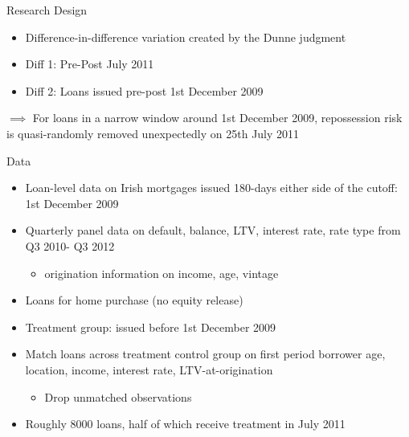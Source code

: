 \documentclass[ignorenonframetext,aspectratio=169]{beamer}
\providecommand{\tightlist}{%
  \setlength{\itemsep}{0pt}\setlength{\parskip}{0pt}}
\begin{document}
\begin{frame}{Research Design}

\begin{itemize}
\item
  Difference-in-difference variation created by the Dunne judgment
\item
  Diff 1: Pre-Post July 2011
\item
  Diff 2: Loans issued pre-post 1st December 2009
\end{itemize}

\(\implies\) For loans in a narrow window around 1st December 2009,
repossession risk is quasi-randomly removed unexpectedly on 25th July
2011

\end{frame}

\begin{frame}{Data}

\begin{itemize}
\item
  Loan-level data on Irish mortgages issued 180-days either side of the
  cutoff: 1st December 2009
\item
  Quarterly panel data on default, balance, LTV, interest rate, rate
  type from Q3 2010- Q3 2012

  \begin{itemize}
  \tightlist
  \item
    origination information on income, age, vintage
  \end{itemize}
\item
  Loans for home purchase (no equity release)
\item
  Treatment group: issued before 1st December 2009
\item
  Match loans across treatment control group on first period borrower
  age, location, income, interest rate, LTV-at-origination

  \begin{itemize}
  \tightlist
  \item
    Drop unmatched observations
  \end{itemize}
\item
  Roughly 8000 loans, half of which receive treatment in July 2011
\end{itemize}

\end{frame}
\end{document}
